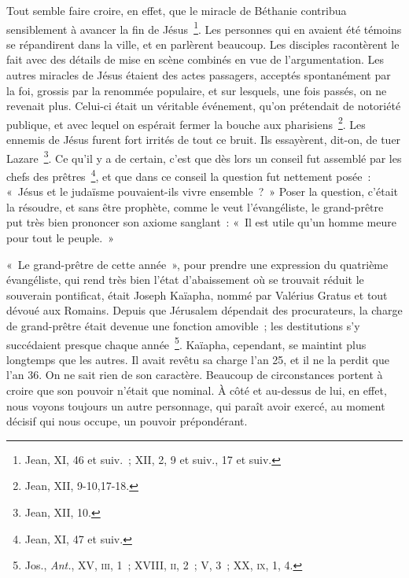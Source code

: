 \documentclass[french,twoside]{book} %
\begin{document}
Tout semble faire croire, en effet, que le miracle de Béthanie contribua sensiblement à avancer la fin de Jésus \footnote{Jean, XI, 46 et suiv. ; XII, 2, 9 et suiv., 17 et suiv.}. Les personnes qui en avaient été témoins se répandirent dans la ville, et en parlèrent beaucoup. Les disciples racontèrent le fait avec des détails de mise en scène combinés en vue de l’argumentation. Les autres miracles de Jésus étaient des actes passagers, acceptés spontanément par la foi, grossis par la renommée populaire, et sur lesquels, une fois passés, on ne revenait plus. Celui-ci était un véritable événement, qu’on prétendait de notoriété publique, et avec lequel on espérait fermer la bouche aux pharisiens \footnote{Jean, XII, 9-10,17-18.}. Les ennemis de Jésus furent fort irrités de tout ce bruit. Ils essayèrent, dit-on, de tuer Lazare \footnote{Jean, XII, 10.}. Ce qu’il y a de certain, c’est que dès lors un conseil fut assemblé par les chefs des prêtres \footnote{Jean, XI, 47 et suiv.}, et que dans ce conseil la question fut nettement posée : « Jésus et le judaïsme pouvaient-ils vivre ensemble ? » Poser la question, c’était la résoudre, et sans être prophète, comme le veut l’évangéliste, le grand-prêtre put très bien prononcer son axiome sanglant : « Il est utile qu’un homme meure pour tout le peuple. »\par
« Le grand-prêtre de cette année », pour prendre une expression du quatrième évangéliste, qui rend très bien l’état d’abaissement où se trouvait réduit le souverain pontificat, était Joseph Kaïapha, nommé par Valérius Gratus et tout dévoué aux Romains. Depuis que Jérusalem dépendait des procurateurs, la charge de grand-prêtre était devenue une fonction amovible ; les destitutions s’y succédaient presque chaque année \footnote{ Jos., {\itshape Ant.}, XV, \textsc{iii}, 1 ; XVIII, \textsc{ii}, 2 ; V, 3 ; XX, \textsc{ix}, 1, 4.}. Kaïapha, cependant, se maintint plus longtemps que les autres. Il avait revêtu sa charge l’an 25, et il ne la perdit que l’an 36. On ne sait rien de son caractère. Beaucoup de circonstances portent à croire que son pouvoir n’était que nominal. À côté et au-dessus de lui, en effet, nous voyons toujours un autre personnage, qui paraît avoir exercé, au moment décisif qui nous occupe, un pouvoir prépondérant.\par
\end{document}
